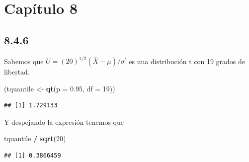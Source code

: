 \documentclass[
  12pt,
]{book}
\newenvironment{Shaded}{\begin{snugshade}}{\end{snugshade}}
\newcommand{\DataTypeTok}[1]{\textcolor[rgb]{0.13,0.29,0.53}{#1}}
\newcommand{\DecValTok}[1]{\textcolor[rgb]{0.00,0.00,0.81}{#1}}
\newcommand{\FloatTok}[1]{\textcolor[rgb]{0.00,0.00,0.81}{#1}}
\newcommand{\KeywordTok}[1]{\textcolor[rgb]{0.13,0.29,0.53}{\textbf{#1}}}
\newcommand{\NormalTok}[1]{#1}
\newcommand{\OperatorTok}[1]{\textcolor[rgb]{0.81,0.36,0.00}{\textbf{#1}}}
\newcommand{\StringTok}[1]{\textcolor[rgb]{0.31,0.60,0.02}{#1}}
\begin{document}
\hypertarget{capuxedtulo-8}{%
\section{Capítulo 8}\label{capuxedtulo-8}}

\hypertarget{section}{%
\subsection{8.4.6}\label{section}}

Sabemos que \(U = (20)^{1/2} (\bar{X}-\mu)/\sigma^\prime\) es una distribución t con 19 grados de libertad.

\begin{Shaded}
\begin{Highlighting}[]
\NormalTok{(tquantile \textless{}{-}}\StringTok{ }\KeywordTok{qt}\NormalTok{(}\DataTypeTok{p =} \FloatTok{0.95}\NormalTok{, }\DataTypeTok{df =} \DecValTok{19}\NormalTok{))}
\end{Highlighting}
\end{Shaded}

\begin{verbatim}
## [1] 1.729133
\end{verbatim}

Y despejando la expresión tenemos que

\begin{Shaded}
\begin{Highlighting}[]
\NormalTok{tquantile }\OperatorTok{/}\StringTok{ }\KeywordTok{sqrt}\NormalTok{(}\DecValTok{20}\NormalTok{)}
\end{Highlighting}
\end{Shaded}

\begin{verbatim}
## [1] 0.3866459
\end{verbatim}

\printbibliography
\end{document}
